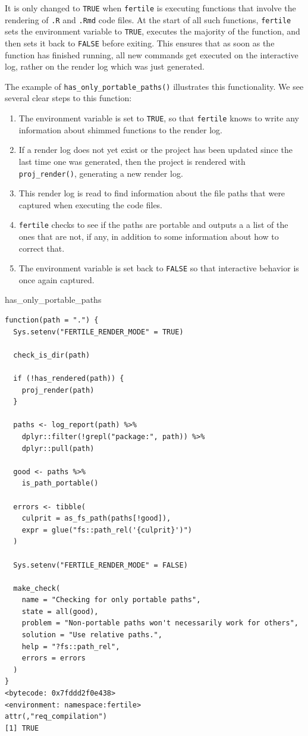 \documentclass[12pt,twoside]{reedthesis}
\newenvironment{Shaded}{\begin{snugshade}}{\end{snugshade}}
\newcommand{\NormalTok}[1]{#1}
\begin{document}
It is only changed to \texttt{TRUE} when \texttt{fertile} is executing functions that involve the rendering of \texttt{.R} and \texttt{.Rmd} code files. At the start of all such functions, \texttt{fertile} sets the environment variable to \texttt{TRUE}, executes the majority of the function, and then sets it back to \texttt{FALSE} before exiting. This ensures that as soon as the function has finished running, all new commands get executed on the interactive log, rather on the render log which was just generated.

The example of \texttt{has\_only\_portable\_paths()} illustrates this functionality. We see several clear steps to this function:
\begin{enumerate}
\def\labelenumi{\arabic{enumi}.}
\item
  The environment variable is set to \texttt{TRUE}, so that \texttt{fertile} knows to write any information about shimmed functions to the render log.
\item
  If a render log does not yet exist or the project has been updated since the last time one was generated, then the project is rendered with \texttt{proj\_render()}, generating a new render log.
\item
  This render log is read to find information about the file paths that were captured when executing the code files.
\item
  \texttt{fertile} checks to see if the paths are portable and outputs a a list of the ones that are not, if any, in addition to some information about how to correct that.
\item
  The environment variable is set back to \texttt{FALSE} so that interactive behavior is once again captured.
\end{enumerate}
\begin{Shaded}
\begin{Highlighting}[]
\NormalTok{has_only_portable_paths}
\end{Highlighting}
\end{Shaded}
\begin{verbatim}
function(path = ".") {
  Sys.setenv("FERTILE_RENDER_MODE" = TRUE)

  check_is_dir(path)

  if (!has_rendered(path)) {
    proj_render(path)
  }

  paths <- log_report(path) %>%
    dplyr::filter(!grepl("package:", path)) %>%
    dplyr::pull(path)

  good <- paths %>%
    is_path_portable()

  errors <- tibble(
    culprit = as_fs_path(paths[!good]),
    expr = glue("fs::path_rel('{culprit}')")
  )

  Sys.setenv("FERTILE_RENDER_MODE" = FALSE)

  make_check(
    name = "Checking for only portable paths",
    state = all(good),
    problem = "Non-portable paths won't necessarily work for others",
    solution = "Use relative paths.",
    help = "?fs::path_rel",
    errors = errors
  )
}
<bytecode: 0x7fddd2f0e438>
<environment: namespace:fertile>
attr(,"req_compilation")
[1] TRUE
\end{verbatim}
\end{document}
